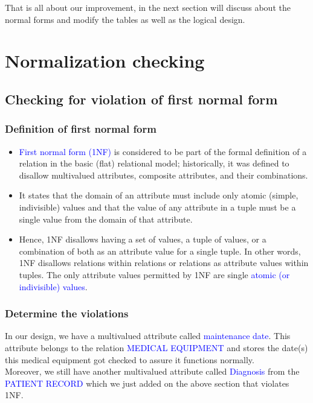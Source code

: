 \documentclass[a4paper]{article}
\numberwithin{equation}{section}
\begin{document}
That is all about our improvement, in the next section will discuss about the normal forms and modify the tables as well as the logical design.
\section{Normalization checking}
\subsection{Checking for violation of first normal form}
\subsubsection{Definition of first normal form }
\begin{itemize}
  \item \textcolor{blue}{First normal form (1NF)} is considered to be part of the formal definition of a relation in the basic (flat) relational model; historically, it was defined to disallow multivalued attributes, composite attributes, and their combinations.
  \item It states that the domain of an attribute must include only atomic (simple, indivisible) values and that the value of any attribute in a tuple must be a single value from the domain of that attribute.
  \item Hence, 1NF disallows having a set of values, a tuple of values, or a
        combination of both as an attribute value for a single tuple. In other words, 1NF
        disallows relations within relations or relations as attribute values within tuples. The
        only attribute values permitted by 1NF are single \textcolor{blue}{atomic (or indivisible) values}.
\end{itemize}

\subsubsection{Determine the violations}
In our design, we have a multivalued attribute called \textcolor{blue}{maintenance date}. This attribute belongs to the relation \textcolor{blue}{MEDICAL EQUIPMENT} and stores the date(s) this medical equipment got checked to assure it functions normally. \\
Moreover, we still have another multivalued attribute called \textcolor{blue}{Diagnosis} from the \textcolor{blue}{PATIENT RECORD} which we just added on the above section that violates 1NF\@.
\end{document}
